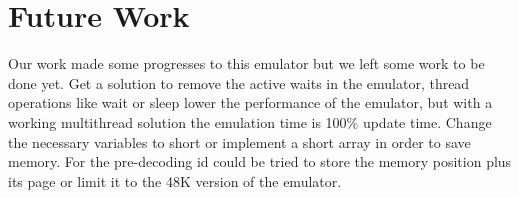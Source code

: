 \section{Future Work}
Our work made some progresses to this emulator but we left some work to be done yet. Get a solution to remove the active waits in the emulator, thread operations like wait or sleep lower the performance of the emulator, but with a working multithread solution the emulation time is 100\% update time. Change the necessary variables to short or implement a short array in order to save memory. For the pre-decoding id could be tried to store the memory position plus its page or limit it to the 48K version of the emulator.